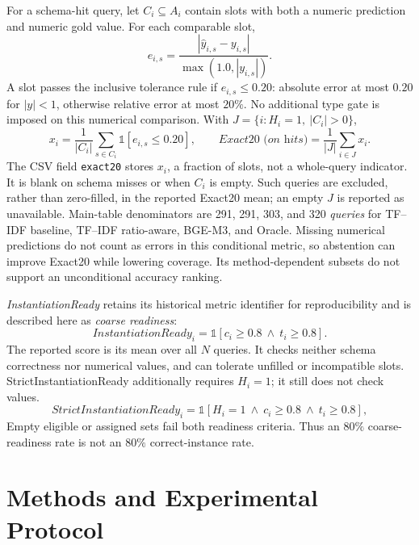 \documentclass[pdflatex,sn-basic,Numbered]{sn-jnl}
\begin{document}
For a schema-hit query, let $C_i\subseteq A_i$ contain slots with both a numeric prediction and numeric gold value. For each comparable slot,
\begin{equation}
 e_{i,s}=\frac{|\hat{y}_{i,s}-y_{i,s}|}{\max(1.0,|y_{i,s}|)}.
\label{eq:bounded_error}
\end{equation}
A slot passes the inclusive tolerance rule if $e_{i,s}\leq0.20$: absolute error at most $0.20$ for $|y|<1$, otherwise relative error at most $20\%$. No additional type gate is imposed on this numerical comparison. With $J=\{i:H_i=1,\ |C_i|>0\}$,
\begin{equation}
x_i=\frac{1}{|C_i|}\sum_{s\in C_i}\mathbb{1}[e_{i,s}\leq0.20],
\qquad
\textit{Exact20 (on hits)}=\frac{1}{|J|}\sum_{i\in J}x_i.
\label{eq:exact20}
\end{equation}
The CSV field \texttt{exact20} stores $x_i$, a fraction of slots, not a whole-query indicator. It is blank on schema misses or when $C_i$ is empty. Such queries are excluded, rather than zero-filled, in the reported Exact20 mean; an empty $J$ is reported as unavailable. Main-table denominators are 291, 291, 303, and 320 \emph{queries} for TF--IDF baseline, TF--IDF ratio-aware, BGE-M3, and Oracle. Missing numerical predictions do not count as errors in this conditional metric, so abstention can improve Exact20 while lowering coverage. Its method-dependent subsets do not support an unconditional accuracy ranking.

\textit{InstantiationReady} retains its historical metric identifier for reproducibility and is described here as \emph{coarse readiness}:
\begin{equation}
\mathit{InstantiationReady}_i=\mathbb{1}[c_i\geq0.8\ \wedge\ t_i\geq0.8].
\label{eq:instantiation_ready}
\end{equation}
The reported score is its mean over all $N$ queries. It checks neither schema correctness nor numerical values, and can tolerate unfilled or incompatible slots. StrictInstantiationReady additionally requires $H_i=1$; it still does not check values.
\begin{equation}
\mathit{StrictInstantiationReady}_i = \mathbb{1}[H_i=1\ \wedge\ c_i\geq0.8\ \wedge\ t_i\geq0.8],
\label{eq:strict_instantiation_ready}
\end{equation} Empty eligible or assigned sets fail both readiness criteria. Thus an $80\%$ coarse-readiness rate is not an $80\%$ correct-instance rate.

\section{Methods and Experimental Protocol}
\label{sec:methodology}\label{sec:method}
\end{document}
